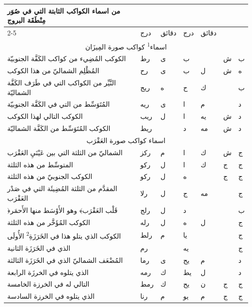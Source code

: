 \documentclass[11pt]{article}
\newcommand{\AbjadZero}{{\NallinoSigns\symbol{"E000}}}
\begin{document}
\begin{Arabic}\begin{tabular}{|p{84mm}|>{\centering\arraybackslash}p{9mm}|>{\centering\arraybackslash}p{9mm}|>{\centering\arraybackslash}p{9mm}|>{\centering\arraybackslash}p{9mm}|>{\centering\arraybackslash}p{14mm}|>{\centering\arraybackslash}p{17mm}|}\hline
\multirow{2}{*}{\parbox{80mm}{\centering من اسماء الكواكب الثابتة التي في صُوَر مِنْطَقَة البروج}} & \multicolumn{2}{c|}{الطول} & \multicolumn{2}{c|}{العرض} & \multirow{2}{*}{\parbox{13mm}{\centering\small علامات الجهة}} & \multirow{2}{*}{\parbox{16mm}{\centering\small مراتب العظمة}} \\ \cline{2-5}
 & {\small درج} & {\small دقائق} & {\small درج} & {\small دقائق} & & \\ \hline
\multicolumn{7}{|c|}{\large اسماء\textsuperscript{1} كواكب صورة المِيزَان} \\ \hline
الكوكب المُضِيء من كواكب الكَفَّة الجنوبيّة & رط & ى & ب & \AbjadZero{} & ش & ب \\
المُظْلِم الشماليّ من هذا الكوكب & رح & ى & ب & ل & ش & ه \\
النَّيِّر من الكواكب التي في طَرَف الكَفَّة الشماليّة & ريج & ه & ح & ك &  & ب \\
المُتَوَسِّط من التي في الكَفَّة الجنوبيّة & ريه & ى & ا & م &  & د \\
الكوكب التالي لهذا الكوكب & ريب & ل & ا & يه & ش & د \\
الكوكب المُتَوَسِّط من الكَفَّة الشماليّة & ريط & \AbjadZero{} & د & مه & ش & د \\
\hline
\multicolumn{7}{|c|}{\large اسماء كواكب صورة العَقْرَب} \\ \hline
الشماليّ من الثلثة التي بين عَيْنَيِ العَقْرَب & ركز & م & ا & ك & ش & ج \\
المتوسِّط من هذه الثلثة & ركو & ل & ا & ك & ج & ج \\
الكوكب الجنوبيّ من هذه الثلثة & ركو & ل & ه & \AbjadZero{} & ج & ج \\
المقدَّم من الثلثة المُضِيئَة التي في صَدْر العَقْرَب & رلا & ل & ج & مه &  & ج \\
﴿قَلْب العَقْرَب﴾ وهو الأَوْسَط منها الأَحمَر & رلج & ل & د & \AbjadZero{} &  & ب \\
الكوكب المُؤَخَّر من هذه الثلثة & رله & ل & ه & ل &  & ج \\
الكوكب الذي يتلو هذا في الخَرَزَةِ\textsuperscript{2} الأُولَى & رلط & م & يا & \AbjadZero{} &  & ج \\
الذي في الخَرَزَة الثانية & رم & \AbjadZero{} & يه & \AbjadZero{} &  & ج \\
المُضْعَف الشماليّ الذي في الخَرَزَة الثالثة & رما & ى & يح & م &  & د \\
الذي يتلوه في الخرزَة الرابعة & رمه & ك & يط & ل &  & د \\
التالي له في الخرزة الخامسة & رمط & ك & يح & ن & ج & ج \\
الذي يتلوه في الخرزة السادسة & رنا & م & يو & م & ج & ج \\
\hline
\end{tabular}\end{Arabic}
\end{document}
